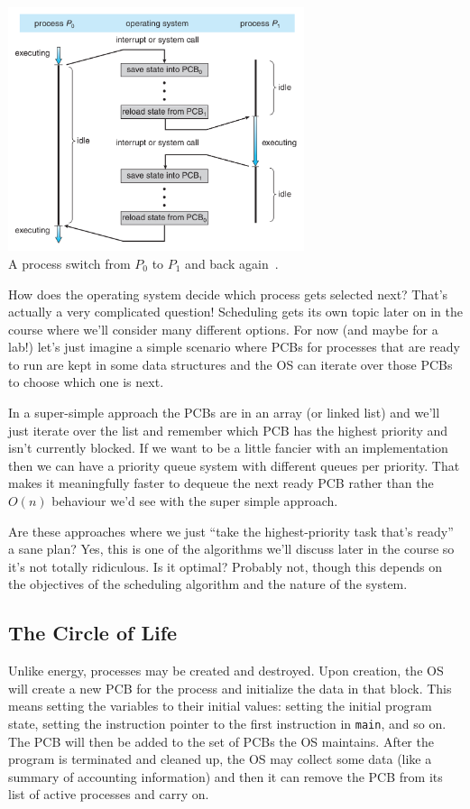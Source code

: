 \begin{center}
	\includegraphics[width=0.65\textwidth]{images/process-switch.png}\\
	A process switch from $P_{0}$ to $P_{1}$ and back again~\cite{osc}.
\end{center}

How does the operating system decide which process gets selected next? That's actually a very complicated question! Scheduling gets its own topic later on in the course where we'll consider many different options. For now (and maybe for a lab!) let's just imagine a simple scenario where PCBs for processes that are ready to run are kept in some data structures and the OS can iterate over those PCBs to choose which one is next. 

In a super-simple approach the PCBs are in an array (or linked list) and we'll just iterate over the list and remember which PCB has the highest priority and isn't currently blocked. If we want to be a little fancier with an implementation then we can have a priority queue system with different queues per priority. That makes it meaningfully faster to dequeue the next ready PCB rather than the $O(n)$ behaviour we'd see with the super simple approach.

Are these approaches where we just ``take the highest-priority task that's ready'' a sane plan? Yes, this is one of the algorithms we'll discuss later in the course so it's not totally ridiculous. Is it optimal? Probably not, though this depends on the objectives of the scheduling algorithm and the nature of the system. 

\subsection*{The Circle of Life}

Unlike energy, processes may be created and destroyed. Upon creation, the OS will create a new PCB for the process and initialize the data in that block. This means setting the variables to their initial values: setting the initial program state, setting the instruction pointer to the first instruction in \texttt{main}, and so on.  The PCB will then be added to the set of PCBs the OS maintains. After the program is terminated and cleaned up, the OS may collect some data (like a summary of accounting information) and then it can remove the PCB from its list of active processes and carry on.

